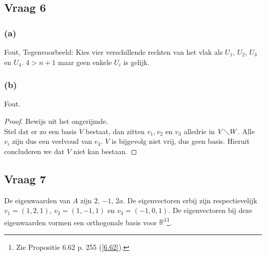 \documentclass[lineaire_algebra_oplossingen.tex]{subfiles}
\begin{document}
\subsection{Vraag 6}
\subsubsection*{(a)}
Fout, Tegenvoorbeeld:
Kies vier verschillende rechten van het vlak als $U_1$, $U_2$, $U_3$ en $U_4$. $4 > n+1$ maar geen enkele $U_i$ is gelijk.

\subsubsection*{(b)}
Fout.
\begin{proof}
Bewijs uit het ongerijmde.\\
Stel dat er zo een basis $V$ bestaat, dan zitten $v_1,v_2$ en $v_3$ alledrie in $V\diagdown W$. Alle $v_i$ zijn dus een veelvoud van $e_3$. $V$ is bijgevolg niet vrij, dus geen basis. Hieruit concluderen we dat $V$ niet kan bestaan.
\end{proof}

\subsection{Vraag 7}
De eigenwaarden van $A$ zijn $2$, $-1$, $2a$. De eigenvectoren erbij zijn respectievelijk $v_1 = (1, 2, 1)$, $v_2 = (1, -1, 1)$ en $v_3 = (-1, 0, 1)$. De eigenvectoren bij deze eigenwaarden vormen een orthogonale basis voor $\mathbb{R}^3$\footnote{Zie Propositie 6.62 p. 255 (\ref{6.62}).}.
\end{document}
